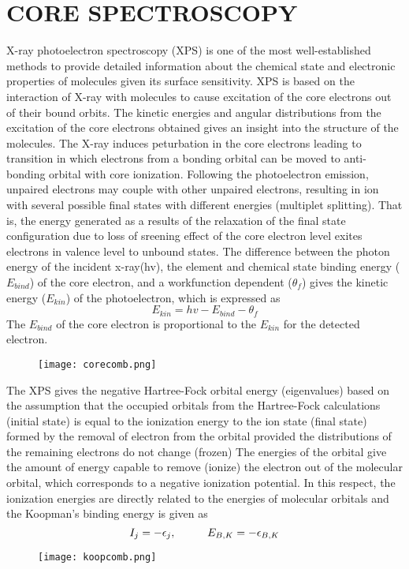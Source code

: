 \documentclass[a4paper,11pt]{report}
\begin{document}
\chapter{CORE SPECTROSCOPY}
X-ray photoelectron spectroscopy (XPS) is one of the most well-established methods to provide detailed
information about the chemical state and electronic properties of molecules given its surface sensitivity.
XPS is based on the interaction of X-ray with molecules to cause excitation of the core electrons out of their
bound orbits. The kinetic energies and angular distributions from the excitation of the core electrons obtained 
gives an insight into the structure of the molecules. 
The X-ray induces peturbation in the core electrons leading to transition in which electrons from 
a bonding orbital can be moved to anti-bonding orbital with core ionization. Following the photoelectron emission,
unpaired electrons may couple with other unpaired electrons, resulting in ion with several possible final states with 
different energies (multiplet splitting). That is, the energy generated as a results of the relaxation of the final 
state configuration due to loss of sreening effect of the core electron level exites electrons in valence level to 
unbound states. 
The difference between the photon energy of the incident x-ray(hv), the element and chemical state  binding energy 
($E_{bind}$) of the core electron, and a workfunction dependent ($\theta_{f}$) gives the kinetic energy ($E_{kin}$) 
of the photoelectron, which is expressed as
\begin{equation}\label{corecomb}
E_{kin} = hv - E_{bind} - \theta_{f}
\end{equation}
The $E_{bind}$ of the core electron is proportional to the $E_{kin}$ for the detected electron.
\begin{figure}[H]\large
\texttt{[image: corecomb.png]}
\caption{}
\label{d2}
\end{figure}
The XPS gives the negative Hartree-Fock orbital energy (eigenvalues) based on the assumption that
the occupied orbitals from the Hartree-Fock calculations (initial state) is equal to the ionization energy
to the ion state (final state) formed by the removal of electron from the orbital provided the distributions of the 
remaining electrons do not change (frozen) The energies of the orbital give the amount of energy capable to remove (ionize) 
the electron out of the molecular orbital, which corresponds to a negative ionization potential. In this respect, the ionization
energies are directly related to the energies of molecular orbitals and the Koopman's binding energy is given as
\begin{equation}\label{koopcomb}
I_{j} = -\epsilon_{j}, \hspace{10mm} E_{B,K} = -\epsilon_{B,K}
\end{equation}
\begin{figure}[H]\large
\texttt{[image: koopcomb.png]}
\caption{}
\label{d3}
\end{figure}
\end{document}
